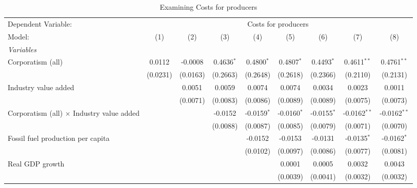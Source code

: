 
\begin{table}[htbp]
   \caption{Examining Costs for producers}
   \centering
   \begin{tabular}{lcccccccc}
      \tabularnewline \midrule \midrule
      Dependent Variable: & \multicolumn{8}{c}{Costs for producers}\\
      Model:                                           & (1)      & (2)      & (3)          & (4)           & (5)           & (6)           & (7)            & (8)\\  
      \midrule
      \emph{Variables}\\
      Corporatism (all)                                & 0.0112   & -0.0008  & 0.4636$^{*}$ & 0.4800$^{*}$  & 0.4807$^{*}$  & 0.4493$^{*}$  & 0.4611$^{**}$  & 0.4761$^{**}$\\   
                                                       & (0.0231) & (0.0163) & (0.2663)     & (0.2648)      & (0.2618)      & (0.2366)      & (0.2110)       & (0.2131)\\   
      Industry value added                             &          & 0.0051   & 0.0059       & 0.0074        & 0.0074        & 0.0034        & 0.0023         & 0.0011\\   
                                                       &          & (0.0071) & (0.0083)     & (0.0086)      & (0.0089)      & (0.0089)      & (0.0075)       & (0.0073)\\   
      Corporatism (all) $\times$ Industry value added  &          &          & -0.0152      & -0.0159$^{*}$ & -0.0160$^{*}$ & -0.0155$^{*}$ & -0.0162$^{**}$ & -0.0162$^{**}$\\   
                                                       &          &          & (0.0088)     & (0.0087)      & (0.0085)      & (0.0079)      & (0.0071)       & (0.0070)\\   
      Fossil fuel production per capita                &          &          &              & -0.0152       & -0.0153       & -0.0131       & -0.0135$^{*}$  & -0.0162$^{*}$\\   
                                                       &          &          &              & (0.0102)      & (0.0097)      & (0.0086)      & (0.0077)       & (0.0081)\\   
      Real GDP growth                                  &          &          &              &               & 0.0001        & 0.0005        & 0.0032         & 0.0043\\   
                                                       &          &          &              &               & (0.0039)      & (0.0041)      & (0.0032)       & (0.0032)\\   

\end{tabular}
\end{table}
